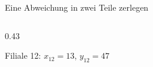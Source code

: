\documentclass[aspectratio=169,11pt]{beamer}
\begin{document}
\begin{frame}{Eine Abweichung in zwei Teile zerlegen}
\begin{columns}[T]
\begin{column}{0.43\textwidth}
\begin{block}{Filiale 12: $x_{12} = 13$, $y_{12} = 47$}
      \end{block}
    \end{column}
  \end{columns}
\end{frame}

\end{document}
